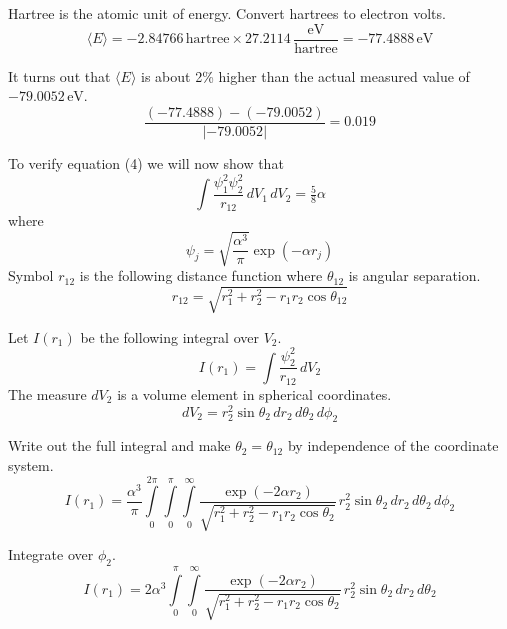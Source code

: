 \documentclass[12pt]{article}
\begin{document}
\noindent
Hartree is the atomic unit of energy.
Convert hartrees to electron volts.
\begin{equation*}
\langle E\rangle=-2.84766\,\text{hartree}\times27.2114\,\frac{\text{eV}}{\text{hartree}}=-77.4888\,\text{eV}
\end{equation*}

\noindent
It turns out that $\langle E\rangle$ is about 2\% higher than the actual measured value of $-79.0052\,\text{eV}$.
\begin{equation*}
\frac{(-77.4888)-(-79.0052)}{|-79.0052|}=0.019
\end{equation*}

\noindent
To verify equation (4) we will now show that
\begin{equation*}
\int\frac{\psi_1^2\psi_2^2}{r_{12}}\,dV_1\,dV_2=\tfrac{5}{8}\alpha
\end{equation*}
where
\begin{equation*}
\psi_j=\sqrt{\frac{\alpha^3}{\pi}}\exp\left(-\alpha r_j\right)
\end{equation*}
Symbol $r_{12}$ is the following distance function where $\theta_{12}$ is angular separation.
\begin{equation*}
r_{12}=\sqrt{r_1^2+r_2^2-r_1r_2\cos\theta_{12}}
\end{equation*}

\noindent
Let $I(r_1)$ be the following integral over $V_2$.
\begin{equation*}
I(r_1)=\int\frac{\psi_2^2}{r_{12}}\,dV_2
\end{equation*}
The measure $dV_2$ is a volume element in spherical coordinates.
\begin{equation*}
dV_2=r_2^2\sin\theta_2\,dr_2\,d\theta_2\,d\phi_2
\end{equation*}

\noindent
Write out the full integral and make $\theta_2=\theta_{12}$ by independence of the coordinate system.
\begin{equation*}
I(r_1)=\frac{\alpha^3}{\pi}
\int\limits_0^{2\pi}\int\limits_0^\pi\int\limits_0^\infty
\frac{\exp(-2\alpha r_2)}{\sqrt{r_1^2+r_2^2-r_1r_2\cos\theta_2}}
\,r_2^2\sin\theta_2\,dr_2\,d\theta_2\,d\phi_2
\end{equation*}

\noindent
Integrate over $\phi_2$.
\begin{equation*}
I(r_1)=
2\alpha^3\int\limits_0^\pi\int\limits_0^\infty
\frac{\exp(-2\alpha r_2)}{\sqrt{r_1^2+r_2^2-r_1r_2\cos\theta_2}}
\,r_2^2\sin\theta_2\,dr_2\,d\theta_2
\end{equation*}
\end{document}
